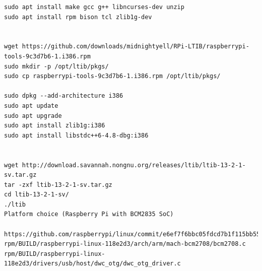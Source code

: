 \documentclass[printmode]{mgr}
\begin{document}


%



\begin{lstlisting}
sudo apt install make gcc g++ libncurses-dev unzip
sudo apt install rpm bison tcl zlib1g-dev


wget https://github.com/downloads/midnightyell/RPi-LTIB/raspberrypi-tools-9c3d7b6-1.i386.rpm
sudo mkdir -p /opt/ltib/pkgs/
sudo cp raspberrypi-tools-9c3d7b6-1.i386.rpm /opt/ltib/pkgs/

sudo dpkg --add-architecture i386
sudo apt update
sudo apt upgrade
sudo apt install zlib1g:i386
sudo apt install libstdc++6-4.8-dbg:i386


wget http://download.savannah.nongnu.org/releases/ltib/ltib-13-2-1-sv.tar.gz
tar -zxf ltib-13-2-1-sv.tar.gz
cd ltib-13-2-1-sv/
./ltib
Platform choice (Raspberry Pi with BCM2835 SoC)

https://github.com/raspberrypi/linux/commit/e6ef7f6bbc05fdcd7b1f115bb55a32c176663296
rpm/BUILD/raspberrypi-linux-118e2d3/arch/arm/mach-bcm2708/bcm2708.c
rpm/BUILD/raspberrypi-linux-118e2d3/drivers/usb/host/dwc_otg/dwc_otg_driver.c
\end{lstlisting}
\end{document}
